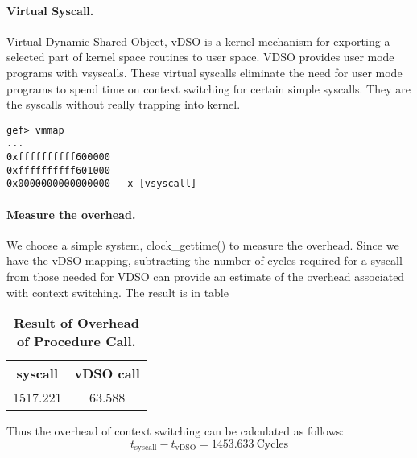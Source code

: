 \paragraph{Virtual Syscall.} Virtual Dynamic Shared Object, vDSO is a kernel mechanism for exporting a selected part of kernel space routines to user space. VDSO provides user mode programs with vsyscalls. These virtual syscalls eliminate the need for user mode programs to spend time on context switching for certain simple syscalls. They are the syscalls without really trapping into kernel.

\begin{lstlisting}[caption=vDSO mapping]
gef> vmmap
...
0xffffffffff600000 
0xffffffffff601000 
0x0000000000000000 --x [vsyscall]
\end{lstlisting}

\paragraph{Measure the overhead.} We choose a simple system, clock\_gettime() to measure the overhead. Since we have the vDSO mapping, subtracting the number of cycles required for a syscall from those needed for VDSO can provide an estimate of the overhead associated with context switching. The result is in table
\begin{table}[h]
	\centering
	\begin{tabular}{c|c}
		\hline
		\bf{syscall} & \bf{vDSO call} \\ \hline
        1517.221 & 63.588 \\ \hline
	\end{tabular}
	\caption{\textbf{Result of Overhead of Procedure Call.}}
	\label{table:procedure-test}
\end{table}
Thus the overhead of context switching can be calculated as follows:
\begin{equation}
    t_{\text{syscall}}-t_{\text{vDSO}}=1453.633\ \text{Cycles}
\end{equation}
    